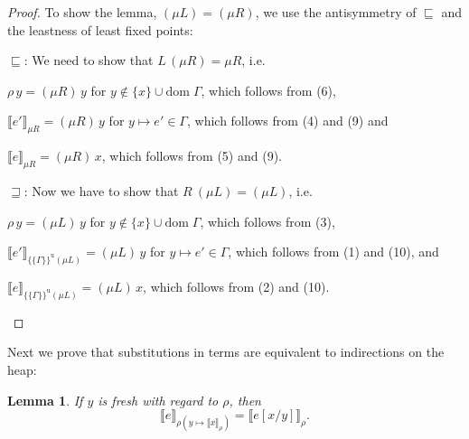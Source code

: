 \documentclass{scrartcl}
\newtheorem{lemma}{Lemma}
\theoremstyle{nonumberbreak}
\newtheorem{proof}{Proof}
\newcommand{\dom}[1]{\text{dom}\;#1}
\newcommand{\dsem}[2]{\llbracket #1 \rrbracket_{#2}}
\newcommand{\esemu}[1]{\{\!\!\!\{#1\}\!\!\!\}^{\text{u}}}
\begin{document}
\begin{proof}
To show the lemma, $(\mu L) = (\mu R)$, we use the antisymmetry of $\sqsubseteq$ and the leastness of least fixed points:
\begin{compactitem}[$\sqsubseteq$:]
\item[$\sqsubseteq$:] We need to show that $L\, (\mu R) = \mu R$, i.e.
\begin{compactitem}
\item $\rho\,y = (\mu R)\, y$ for $y \notin \{x\}\cup \dom\Gamma$, which follows from (6),
\item $\dsem{e'}{\mu R} = (\mu R)\, y$ for $y \mapsto e' \in \Gamma$, which follows from (4) and (9) and
\item $\dsem{e}{\mu R} = (\mu R)\, x$, which follows from (5) and (9).
\end{compactitem}
\item[$\sqsupseteq$:] Now we have to show that $R\ (\mu L) = (\mu L)$, i.e.
\begin{compactitem}
\item $\rho\,y = (\mu L)\, y$ for $y \notin \{x\}\cup \dom\Gamma$, which follows from (3),
\item $\dsem{e'}{\esemu{\Gamma}{(\mu L)}} = (\mu L)\, y$ for $y \mapsto e' \in \Gamma$, which follows from (1) and (10), and
\item $\dsem{e}{\esemu{\Gamma}{(\mu L)}} = (\mu L)\, x$, which follows from (2) and (10).
\end{compactitem}
\end{compactitem}
\end{proof}

Next we prove that substitutions in terms are equivalent to indirections on the heap:

\begin{lemma}
If $y$ is fresh with regard to $\rho$, then
\label{lem:subst}
\[
\dsem{e}{\rho (y \mapsto \dsem{x}\rho)} = \dsem{ e[x/y]}{\rho}.
\]
\end{lemma}
\end{document}

